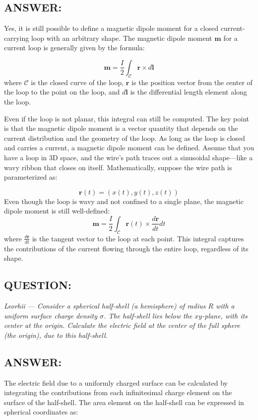 \documentclass[12pt]{article}
\begin{document}
\subsection*{ANSWER:}
Yes, it is still possible to define a magnetic dipole moment for a closed current-carrying loop with an arbitrary shape. The magnetic dipole moment $\mathbf{m}$ for a current loop is generally given by the formula:

\[
\mathbf{m} = \frac{I}{2} \int_{\mathcal{C}} \mathbf{r} \times d\mathbf{l}
\]
\noindent
where $\mathcal{C}$ is the closed curve of the loop, $\mathbf{r}$ is the position vector from the center of the loop to the point on the loop, and $d\mathbf{l}$ is the differential length element along the loop.

Even if the loop is not planar, this integral can still be computed. The key point is that the magnetic dipole moment is a vector quantity that depends on the current distribution and the geometry of the loop. As long as the loop is closed and carries a current, a magnetic dipole moment can be defined.
Assume that you have a loop in 3D space, and the wire’s path traces out a sinusoidal shape—like a wavy ribbon that closes on itself. Mathematically, suppose the wire path is parameterized as:

\[
\mathbf{r}(t) = (x(t), y(t), z(t))
\]
\noindent
Even though the loop is wavy and not confined to a single plane, the magnetic dipole moment is still well-defined:
\[
\mathbf{m} = \frac{I}{2} \int_{\mathcal{C}} \mathbf{r}(t) \times \frac{d\mathbf{r}}{dt} dt
\]
\noindent
where $\frac{d\mathbf{r}}{dt}$ is the tangent vector to the loop at each point. This integral captures the contributions of the current flowing through the entire loop, regardless of its shape.

\newpage


\subsection*{QUESTION:}
\emph{Leorhii --- Consider a spherical half-shell (a hemisphere) of radius $R$ with a uniform surface charge density $\sigma$. The half-shell lies below the $xy$-plane, with its center at the origin. Calculate the electric field at the center of the full sphere (the origin), due to this half-shell.} 
\subsection*{ANSWER:}
The electric field due to a uniformly charged surface can be calculated by integrating the contributions from each infinitesimal charge element on the surface of the half-shell. The area element on the half-shell can be expressed in spherical coordinates as:
\end{document}
